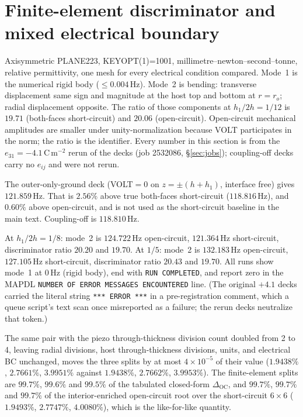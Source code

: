 \documentclass[11pt]{article}
\begin{document}
\section{Finite-element discriminator and mixed electrical boundary}
\label{sec:s3}
Axisymmetric PLANE223, KEYOPT(1)=1001, millimetre--newton--second--tonne,
relative permittivity, one mesh for every electrical condition compared.
Mode~1 is the numerical rigid body ($\le 0.004\,\mathrm{Hz}$). Mode~2 is
bending: transverse displacement same sign and magnitude at the host top
and bottom at $r=r_o$; radial displacement opposite. The ratio of those
components at $h_1/2h=1/12$ is $19.71$ (both-faces short-circuit) and
$20.06$ (open-circuit). Open-circuit mechanical amplitudes are
smaller under unity-normalization because VOLT participates in the norm;
the ratio is the identifier. Every number in this section is from the
$e_{31}=-4.1\,\mathrm{C\,m^{-2}}$ rerun of the decks (job 2532086,
\S\ref{sec:jobs}); coupling-off decks carry no $e_{ij}$ and were not
rerun.

The outer-only-ground deck (VOLT$=0$ on $z=\pm(h+h_1)$, interface free)
gives $121.859\,\mathrm{Hz}$. That is $2.56\%$ above true both-faces
short-circuit ($118.816\,\mathrm{Hz}$), and $0.60\%$ above open-circuit,
and is not used as the short-circuit baseline in the main text.
Coupling-off is $118.810\,\mathrm{Hz}$.

At $h_1/2h=1/8$: mode~2 is $124.722\,\mathrm{Hz}$ open-circuit,
$121.364\,\mathrm{Hz}$ short-circuit, discriminator ratio $20.20$ and
$19.70$. At $1/5$: mode~2 is $132.183\,\mathrm{Hz}$ open-circuit,
$127.105\,\mathrm{Hz}$ short-circuit, discriminator ratio $20.43$ and
$19.70$. All runs show mode~1 at $0\,\mathrm{Hz}$ (rigid body), end
with \texttt{RUN COMPLETED}, and report zero in the MAPDL
\texttt{NUMBER OF ERROR MESSAGES ENCOUNTERED} line. (The original
$+4.1$ decks carried the literal string \texttt{*** ERROR ***} in a
pre-registration comment, which a queue script's text scan once
misreported as a failure; the rerun decks neutralize that token.)

The same pair with the piezo through-thickness division count doubled
from 2 to 4, leaving radial divisions, host through-thickness divisions,
units, and electrical BC unchanged, moves the three splits by at most
$4\times10^{-5}$ of their value ($1.9438\%$, $2.7661\%$, $3.9951\%$
against $1.9438\%$, $2.7662\%$, $3.9953\%$). The finite-element splits
are $99.7\%$, $99.6\%$ and $99.5\%$ of the tabulated closed-form
$\Delta_{\mathrm{OC}}$, and $99.7\%$, $99.7\%$ and $99.7\%$ of the
interior-enriched open-circuit root over the short-circuit $6\times6$
($1.9493\%$, $2.7747\%$, $4.0080\%$), which is the like-for-like
quantity.
\end{document}
